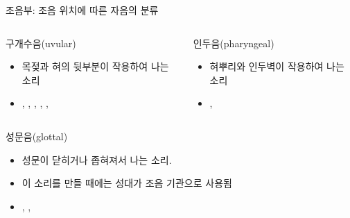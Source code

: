 \documentclass[11pt, aspectratio=169]{beamer}
\newcommand{\textds}[1]{{\ipafont #1}}
\begin{document}
\begin{frame}[t]{조음부: 조음 위치에 따른 자음의 분류}
    \begin{columns}
        \begin{column}{0.46\textwidth}
            \begin{block}{구개수음(uvular)}
                \begin{itemize}
                    \item 목젖과 혀의 뒷부분이 작용하여 나는 소리
                    \item \textds{[q]}, \textds{[ɢ]}, \textds{[ɴ]}, \textds{[χ]}, \textds{[ʁ]}, \textds{[ʀ]}
                \end{itemize}
            \end{block}            
        \end{column}
        \begin{column}{0.47\textwidth}
            \begin{block}{인두음(pharyngeal)}
                \begin{itemize}
                    \item 혀뿌리와 인두벽이 작용하여 나는 소리
                    \item \textds{[ħ]}, \textds{[ʕ]}
                \end{itemize}
            \end{block}            
        \end{column}
    \end{columns}
    \begin{block}{성문음(glottal)}
        \begin{itemize}
            \item 성문이 닫히거나 좁혀져서 나는 소리. 
            \item 이 소리를 만들 때에는 성대가 조음 기관으로 사용됨
            \item \textds{[ʔ]}, \textds{[h]}, \textds{[ɦ]}
        \end{itemize}
    \end{block}

\end{frame}
\end{document}
